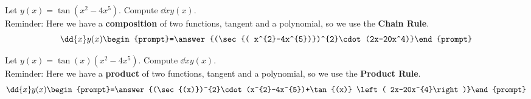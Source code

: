\documentclass{ximera}
\author{Bart Snapp\and Nela lakos}
\begin{document}
\begin{exercise}
Let $y(x) = \tan{ \left( x^{2}-4x^{5}\right)}$. Compute $\dd{x}y(x)$.\\

Reminder: Here we have a \textbf{composition} of two functions, tangent and a polynomial, so we use the \textbf{Chain Rule}.
\[
\dd{x}y(x)
\begin{prompt}=\answer{(\sec{( x^{2}-4x^{5})})^{2}\cdot(2x-20x^4)}\end{prompt}
\]

\end{exercise}
\begin{exercise}
Let $y(x) = \tan{(x)} \left( x^{2}-4x^{5}\right)$. Compute $\dd{x}y(x)$.\\

Reminder: Here we have a \textbf{product} of two functions, tangent and a polynomial, so we use the\textbf{ Product Rule}.
\[
\dd{x}y(x)
\begin{prompt}=\answer{(\sec{(x)})^{2}\cdot(x^{2}-4x^{5})+\tan{(x)} \left( 2x-20x^{4}\right)}\end{prompt}
\]
\end{exercise}
\end{document}
